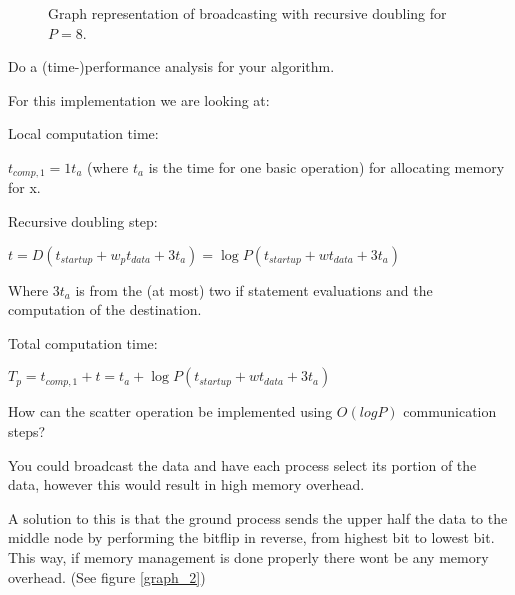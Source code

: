 \documentclass[a4paper]{exam}
\begin{document}
\begin{questions}
\begin{figure}[ht!]
\caption{Graph representation of broadcasting with recursive doubling for $P = 8$.}
\label{graph}
\end{figure}

\pagebreak


\addpoints \question Do a (time-)performance analysis for your algorithm.

\begin{solution}
  For this implementation we are looking at:

  Local computation time:

  $t_{comp,1} = 1t_a$ (where $t_a$ is the time for one basic operation) for allocating memory for x.

  Recursive doubling step:

  $t = D(t_{startup} + w_pt_{data} + 3t_a) = \log P(t_{startup} + wt_{data} + 3t_a)$

  Where $3t_a$ is from the (at most) two if statement evaluations and the computation of the destination.

  Total computation time:

  $T_p = t_{comp,1} + t = t_a + \log P(t_{startup} + wt_{data} + 3t_a)$
\end{solution}

\addpoints \question How can the scatter operation be implemented using $O(log P)$ communication steps?

\begin{solution}
You could broadcast the data and have each process select its portion of the data, however this would result in high memory overhead.

A solution to this is that the ground process sends the upper half the data to the middle node by performing the bitflip in reverse, from highest bit to lowest bit. This way, if memory management is done properly there wont be any memory overhead. (See figure \ref{graph_2})
\end{solution}


\end{questions}
\end{document}
